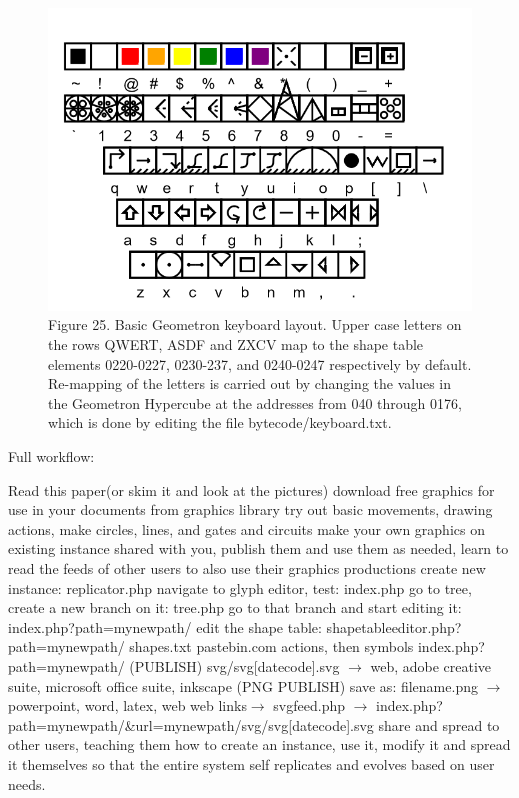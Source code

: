 \documentclass[11pt]{article}
\begin{document}
\begin{figure}

\includegraphics[width=\linewidth]{figures/figure_keyboard.png}

\caption{Figure 25. Basic Geometron keyboard layout. Upper case letters on the rows QWERT, ASDF and ZXCV map to the shape table elements 0220-0227, 0230-237, and 0240-0247 respectively by default.  Re-mapping of the letters is carried out by changing the values in the Geometron Hypercube at the addresses from 040 through 0176, which is done by editing the file bytecode/keyboard.txt.}
\end{figure}



Full workflow:

Read this paper(or skim it and look at the pictures) 
download free graphics for use in your documents from graphics library
try out basic movements, drawing actions, make circles, lines, and gates and circuits
make your own graphics on existing instance shared with you, publish them and use them as needed, learn to read the feeds of other users to also use their graphics productions
create new instance:
replicator.php
navigate to glyph editor, test:
index.php
go to tree, create a new branch on it:
tree.php
go to that branch and start editing it:
index.php?path=mynewpath/
edit the shape table:
shapetableeditor.php?path=mynewpath/
shapes.txt
pastebin.com 
actions, then symbols
index.php?path=mynewpath/
(PUBLISH)
svg/svg[datecode].svg $\rightarrow$ web, adobe creative suite, microsoft office suite, inkscape
(PNG PUBLISH)
save as: filename.png $\rightarrow$ powerpoint, word, latex, web
web links$\rightarrow$ svgfeed.php $\rightarrow$ index.php?path=mynewpath/&url=mynewpath/svg/svg[datecode].svg
share and spread to other users, teaching them how to create an instance, use it, modify it and spread it themselves so that the entire system self replicates and evolves based on user needs.  
\end{document}
